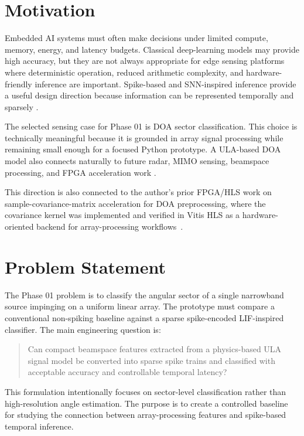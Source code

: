 \documentclass[11pt]{report}
\begin{document}
\section{Motivation}

Embedded AI systems must often make decisions under limited compute, memory, energy, and latency budgets. Classical deep-learning models may provide high accuracy, but they are not always appropriate for edge sensing platforms where deterministic operation, reduced arithmetic complexity, and hardware-friendly inference are important. Spike-based and SNN-inspired inference provide a useful design direction because information can be represented temporally and sparsely \cite{maass1997networks,roy2019towards}.

The selected sensing case for Phase 01 is DOA sector classification. This choice is technically meaningful because it is grounded in array signal processing while remaining small enough for a focused Python prototype. A ULA-based DOA model also connects naturally to future radar, MIMO sensing, beamspace processing, and FPGA acceleration work \cite{vantrees2002optimum,haykin2014adaptive}.

This direction is also connected to the author's prior FPGA/HLS work on sample-covariance-matrix acceleration for DOA preprocessing, where the covariance kernel was implemented and verified in Vitis HLS as a hardware-oriented backend for array-processing workflows~\cite{molhem2026scmhls}.

\section{Problem Statement}

The Phase 01 problem is to classify the angular sector of a single narrowband source impinging on a uniform linear array. The prototype must compare a conventional non-spiking baseline against a sparse spike-encoded LIF-inspired classifier. The main engineering question is:

\begin{quote}
Can compact beamspace features extracted from a physics-based ULA signal model be converted into sparse spike trains and classified with acceptable accuracy and controllable temporal latency?
\end{quote}

This formulation intentionally focuses on sector-level classification rather than high-resolution angle estimation. The purpose is to create a controlled baseline for studying the connection between array-processing features and spike-based temporal inference.
\end{document}
